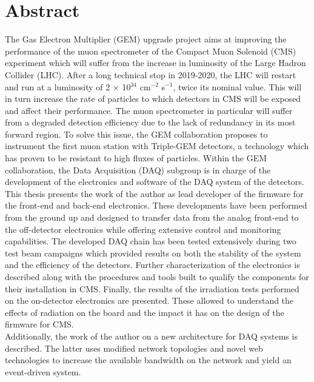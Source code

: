 \chapter*{Abstract}

  The Gas Electron Multiplier (GEM) upgrade project aims at improving the performance of the muon spectrometer of the Compact Muon Solenoid (CMS) experiment which will suffer from the increase in luminosity of the Large Hadron Collider (LHC). After a long technical stop in 2019-2020, the LHC will restart and run at a luminosity of 2 $\times$ 10$^{34}$ cm$^{-2}$ s$^{-1}$, twice its nominal value. This will in turn increase the rate of particles to which detectors in CMS will be exposed and affect their performance. The muon spectrometer in particular will suffer from a degraded detection efficiency due to the lack of redundancy in its most forward region. To solve this issue, the GEM collaboration proposes to instrument the first muon station with Triple-GEM detectors, a technology which has proven to be resistant to high fluxes of particles. Within the GEM collaboration, the Data Acquisition (DAQ) subgroup is in charge of the development of the electronics and software of the DAQ system of the detectors. \\

  This thesis presents the work of the author as lead developer of the firmware for the front-end and back-end electronics. These developments have been performed from the ground up and designed to transfer data from the analog front-end to the off-detector electronics while offering extensive control and monitoring capabilities. The developed DAQ chain has been tested extensively during two test beam campaigns which provided results on both the stability of the system and the efficiency of the detectors. Further characterization of the electronics is described along with the procedures and tools built to qualify the components for their installation in CMS. Finally, the results of the irradiation tests performed on the on-detector electronics are presented. These allowed to understand the effects of radiation on the board and the impact it has on the design of the firmware for CMS. \\

  Additionally, the work of the author on a new architecture for DAQ systems is described. The latter uses modified network topologies and novel web technologies to increase the available bandwidth on the network and yield an event-driven system.

